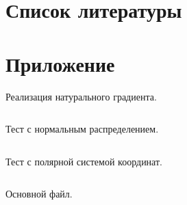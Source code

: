\documentclass[a4paper,12pt]{article}
\begin{document}
\section{Список литературы}
\nocite{*}
\printbibliography[heading=none]
\newpage

\section{Приложение}

Реализация натурального градиента.
%
\inputminted{python}{code/natgrad.py}
\newpage
Тест с нормальным распределением.
%
\inputminted{python}{code/likelihood_test.py}
\newpage
Тест с полярной системой координат.
%
\inputminted{python}{code/polar_test.py}
\newpage
Основной файл.
%
\inputminted{python}{code/main.py}
\newpage
\end{document}
